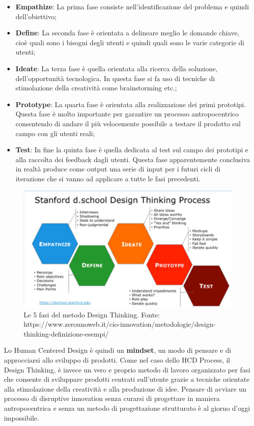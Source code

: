 \begin{itemize}
	\item \textbf{Empathize}: La prima fase consiste nell’identificazione del problema e quindi dell’obiettivo; 
	\item \textbf{Define}: La seconda fase è orientata a delineare meglio le domande chiave, cioè quali sono i bisogni degli utenti e quindi quali sono le varie categorie di utenti;
	\item \textbf{Ideate}: La terza fase è quella orientata alla ricerca della soluzione, dell'opportunità tecnologica. In questa fase si fa uso di tecniche di stimolazione della creatività come brainstorming etc.;
	\item \textbf{Prototype}: La quarta fase è orientata alla realizzazione dei primi prototipi. Questa fase è molto importante per garantire un processo antropocentrico consentendo di andare il più velocemente possibile a testare il prodotto sul campo con gli utenti reali;
	\item \textbf{Test}: In fine la quinta fase è quella dedicata al test sul campo dei prototipi e alla raccolta dei feedback dagli utenti. Questa fase apparentemente conclusiva in realtà produce come output una serie di input per i futuri cicli di iterazione che si vanno ad applicare a tutte le fasi precedenti.
	
\end{itemize}

\begin{figure}
	\centering
	\includegraphics[width=\textwidth]{immagini/designthinking}
	\caption{Le 5 fasi del metodo Design Thinking. Fonte: https://www.zerounoweb.it/cio-innovation/metodologie/design-thinking-definizione-esempi/}
\end{figure}


Lo Human Centered Design è quindi un \textbf{mindset}, un modo di pensare e di approcciarsi allo sviluppo di prodotti. Come nel caso dello HCD Process, il Design Thinking, è invece un vero e proprio metodo di lavoro organizzato per fasi che consente di sviluppare prodotti centrati sull'utente grazie a tecniche orientate alla stimolazione della creatività e alla produzione di idee. Pensare di avviare un processo di disruptive innovation senza curarsi di progettare in maniera antropocentrica e senza un metodo di progettazione strutturato è al giorno d'oggi impossibile.

